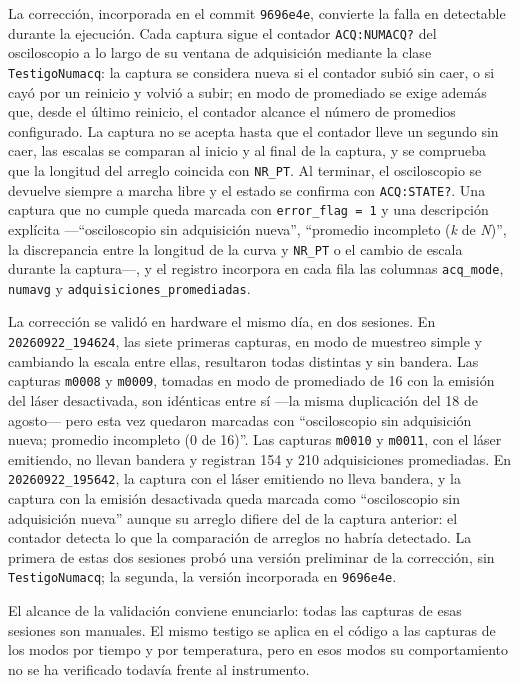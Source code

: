 La corrección, incorporada en el commit \texttt{9696e4e}, convierte la
falla en detectable durante la ejecución. Cada captura sigue el
contador \texttt{ACQ:NUMACQ?} del osciloscopio a lo largo de su ventana
de adquisición mediante la clase \texttt{TestigoNumacq}: la captura se
considera nueva si el contador subió sin caer, o si cayó por un
reinicio y volvió a subir; en modo de promediado se exige además que,
desde el último reinicio, el contador alcance el número de promedios
configurado. La captura no se acepta hasta que el contador lleve un
segundo sin caer, las escalas se comparan al inicio y al final de la
captura, y se comprueba que la longitud del arreglo coincida con
\texttt{NR\_PT}. Al terminar, el osciloscopio se devuelve siempre a
marcha libre y el estado se confirma con \texttt{ACQ:STATE?}. Una
captura que no cumple queda marcada con \texttt{error\_flag = 1} y una
descripción explícita ---\enquote{osciloscopio sin adquisición nueva},
\enquote{promedio incompleto (\emph{k} de \emph{N})}, la discrepancia
entre la longitud de la curva y \texttt{NR\_PT} o el cambio de escala
durante la captura---, y el registro incorpora en cada fila las
columnas \texttt{acq\_mode}, \texttt{numavg} y
\texttt{adquisiciones\_promediadas}.

La corrección se validó en hardware el mismo día, en dos sesiones. En
\texttt{20260922\_194624}, las siete primeras capturas, en modo
de muestreo simple y cambiando la escala entre ellas, resultaron todas
distintas y sin bandera. Las capturas \texttt{m0008} y \texttt{m0009},
tomadas en modo de promediado de 16 con la emisión del láser
desactivada, son idénticas entre sí ---la misma duplicación del 18 de
agosto--- pero esta vez quedaron marcadas con \enquote{osciloscopio sin
adquisición nueva; promedio incompleto (0 de 16)}. Las capturas
\texttt{m0010} y \texttt{m0011}, con el láser emitiendo, no llevan
bandera y registran 154 y 210 adquisiciones promediadas. En
\texttt{20260922\_195642}, la captura con el láser emitiendo no lleva
bandera, y la captura con la emisión desactivada queda marcada como
\enquote{osciloscopio sin adquisición nueva} aunque su arreglo difiere
del de la captura anterior: el contador detecta lo que la comparación
de arreglos no habría detectado. La primera de estas dos sesiones probó
una versión preliminar de la corrección, sin \texttt{TestigoNumacq}; la
segunda, la versión incorporada en \texttt{9696e4e}.

El alcance de la validación conviene enunciarlo: todas las capturas de
esas sesiones son manuales. El mismo testigo se aplica en el código a
las capturas de los modos por tiempo y por temperatura, pero en esos
modos su comportamiento no se ha verificado todavía frente al
instrumento.


